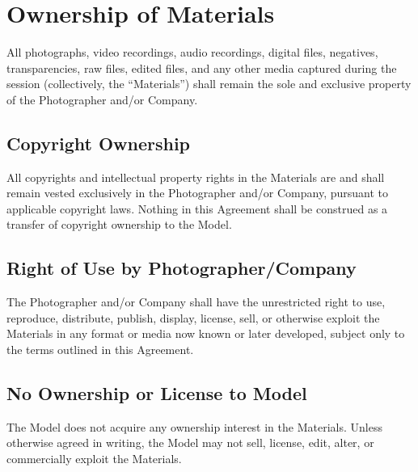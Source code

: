 
\section{Ownership of Materials}
\label{sec:ownership}

All photographs, video recordings, audio recordings, digital files, negatives, transparencies, raw files, edited files, and any other media captured during the session (collectively, the “Materials”) shall remain the sole and exclusive property of the Photographer and/or Company.

\subsection{Copyright Ownership}
All copyrights and intellectual property rights in the Materials are and shall remain vested exclusively in the Photographer and/or Company, pursuant to applicable copyright laws. Nothing in this Agreement shall be construed as a transfer of copyright ownership to the Model.

\subsection{Right of Use by Photographer/Company}
The Photographer and/or Company shall have the unrestricted right to use, reproduce, distribute, publish, display, license, sell, or otherwise exploit the Materials in any format or media now known or later developed, subject only to the terms outlined in this Agreement.

\subsection{No Ownership or License to Model}
The Model does not acquire any ownership interest in the Materials. Unless otherwise agreed in writing, the Model may not sell, license, edit, alter, or commercially exploit the Materials.

